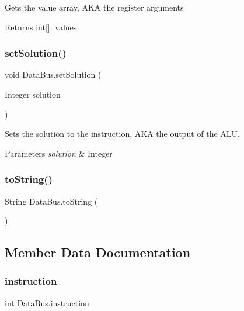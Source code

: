 Gets the value array, A\+KA the register arguments \begin{DoxyReturn}{Returns}
int\mbox{[}\mbox{]}\+: values 
\end{DoxyReturn}
\mbox{\label{class_data_bus_a6843337471ebfcff30de95ade080073a}} 
\subsubsection{\texorpdfstring{set\+Solution()}{setSolution()}}
{\footnotesize\ttfamily void Data\+Bus.\+set\+Solution (\begin{DoxyParamCaption}\item[{Integer}]{solution }\end{DoxyParamCaption})\hspace{0.3cm}{\ttfamily [package]}}

Sets the solution to the instruction, A\+KA the output of the A\+LU. 
\begin{DoxyParams}{Parameters}
{\em solution} & Integer \\
\hline
\end{DoxyParams}
\mbox{\label{class_data_bus_a9c365db4495bd6ea2f6391cd7b1b03d7}} 
\subsubsection{\texorpdfstring{to\+String()}{toString()}}
{\footnotesize\ttfamily String Data\+Bus.\+to\+String (\begin{DoxyParamCaption}{ }\end{DoxyParamCaption})}



\subsection{Member Data Documentation}
\mbox{\label{class_data_bus_a218abec8c222ce33ebf92c402de80541}} 
\subsubsection{\texorpdfstring{instruction}{instruction}}
{\footnotesize\ttfamily int Data\+Bus.\+instruction\hspace{0.3cm}{\ttfamily [private]}}

